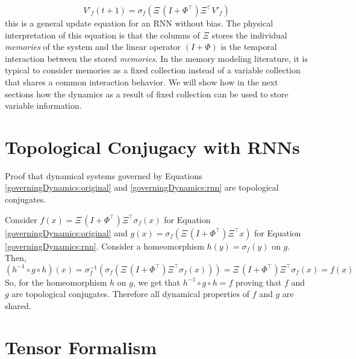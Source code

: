 \documentclass[11pt]{article}
\theoremstyle{definition}
\begin{document}
%
\begin{dmath}
	V'_f(t+1) = \sigma_f(\Xi \, (I + \Phi^\top) \Xi^\top V'_f)
	\label{governingDynamics:rnn}
\end{dmath}
%
this is a general update equation for an RNN without bias. The physical interpretation of this equation is that the columns of $\Xi$ stores the individual \textit{memories} of the system and the linear operator $(I+\Phi)$ is the temporal interaction between the stored \textit{memories}.
%
In the memory modeling literature, it is typical to consider memories as a fixed collection instead of a variable collection that shares a common interaction behavior. We will show how in the next sections how the dynamics as a result of fixed collection can be used to store variable information.
%
\section{Topological Conjugacy with RNNs}
%
Proof that dynamical systems governed by Equations \ref{governingDynamics:original} and \ref{governingDynamics:rnn} are topological conjugates.

Consider $f(x) = \Xi \, (I + \Phi^\top) \Xi^\top \sigma_f(x)$ for Equation \ref{governingDynamics:original} and $g(x) = \sigma_f(\Xi \, (I + \Phi^\top) \Xi^\top x)$ for Equation \ref{governingDynamics:rnn}. Consider a homeomorphism $h(y) = \sigma_f(y)$ on $g$. Then,
%
\begin{dmath}
	(h^{-1} \circ g \circ h) (x) = \sigma_f^{-1}( \sigma_f(\Xi \, (I + \Phi^\top) \Xi^\top \sigma_f(x)) ) = \Xi \, (I + \Phi^\top) \Xi^\top \sigma_f(x) = f(x)
\end{dmath}
%
So, for the homeomorphism $h$ on $g$, we get that $h^{-1} \circ g \circ h = f$ proving that $f$ and $g$ are topological conjugates. Therefore all dynamical properties of $f$ and $g$ are shared.
%
\section{Tensor Formalism}
\end{document}
